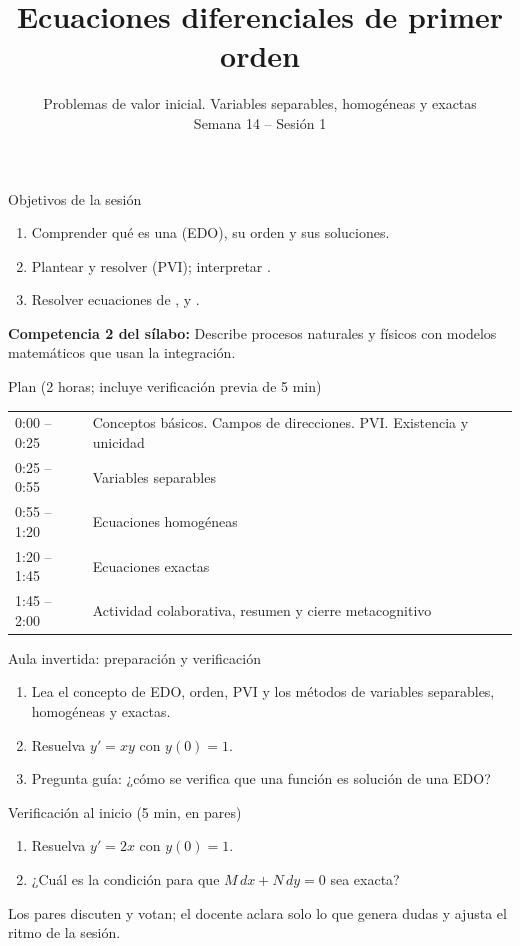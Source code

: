 \documentclass[10pt,aspectratio=169]{beamer}
\title[EDO de primer orden]{Ecuaciones diferenciales de primer orden}
\subtitle{Problemas de valor inicial. Variables separables, homogéneas y exactas\\[2pt]\small Semana 14 -- Sesión 1}
\begin{document}
\begin{frame}
  \titlepage
\end{frame}

\begin{frame}{Objetivos de la sesión}
  \begin{enumerate}
    \item Comprender qué es una  (EDO), su orden y sus soluciones.
    \item Plantear y resolver  (PVI); interpretar .
    \item Resolver ecuaciones de ,  y .
  \end{enumerate}
  \vspace{1mm}
  {\small\textbf{Competencia 2 del sílabo:} Describe procesos naturales y físicos con modelos matemáticos que usan la integración.}
  \begin{block}{Plan (2 horas; incluye verificación previa de 5 min)}
    \begin{tabular}{ll}
      0:00 -- 0:25 & Conceptos básicos. Campos de direcciones. PVI. Existencia y unicidad\\
      0:25 -- 0:55 & Variables separables\\
      0:55 -- 1:20 & Ecuaciones homogéneas\\
      1:20 -- 1:45 & Ecuaciones exactas\\
      1:45 -- 2:00 & Actividad colaborativa, resumen y cierre metacognitivo
    \end{tabular}
  \end{block}
\end{frame}

\begin{frame}{Aula invertida: preparación y verificación}
  \small
  \begin{previa}
    \begin{enumerate}
      \item Lea el concepto de EDO, orden, PVI y los métodos de variables separables, homogéneas y exactas.
      \item Resuelva $y'=xy$ con $y(0)=1$.
      \item Pregunta guía: ¿cómo se verifica que una función es solución de una EDO?
    \end{enumerate}
  \end{previa}
  \begin{block}{Verificación al inicio (5 min, en pares)}
    \begin{enumerate}
      \item Resuelva $y'=2x$ con $y(0)=1$.
      \item ¿Cuál es la condición para que $M\,dx+N\,dy=0$ sea exacta?
    \end{enumerate}
    Los pares discuten y votan; el docente aclara solo lo que genera dudas y ajusta el ritmo de la sesión.
  \end{block}
\end{frame}
\end{document}
